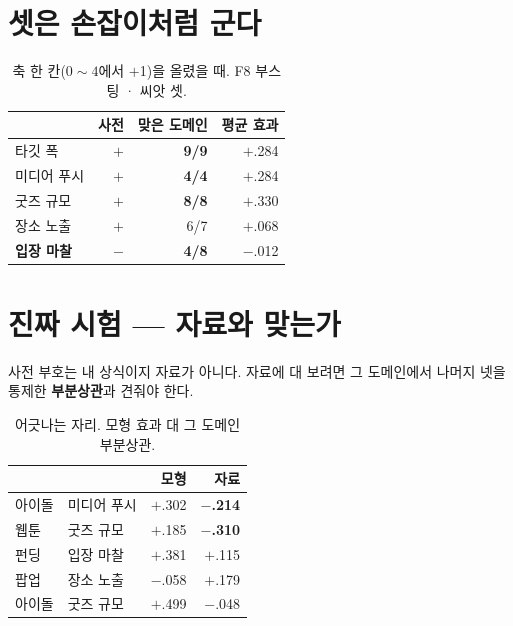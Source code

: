 \documentclass[10pt]{article}
\begin{document}
\section{셋은 손잡이처럼 군다}

\begin{table}[t]
\centering\tsize
\caption{축 한 칸($0\!\sim\!4$에서 $+$1)을 올렸을 때. F8 부스팅 · 씨앗 셋.}
\begin{tabular}{lrrr}
\toprule
& 사전 & 맞은 도메인 & 평균 효과 \\
\midrule
타깃 폭 & $+$ & \textbf{9/9} & $+$.284 \\
미디어 푸시 & $+$ & \textbf{4/4} & $+$.284 \\
굿즈 규모 & $+$ & \textbf{8/8} & $+$.330 \\
\midrule
장소 노출 & $+$ & 6/7 & $+$.068 \\
\textbf{입장 마찰} & $-$ & \textbf{4/8} & $-$.012 \\
\bottomrule
\end{tabular}
\end{table}



\section{진짜 시험 --- 자료와 맞는가}

사전 부호는 내 상식이지 자료가 아니다. 자료에 대 보려면 그 도메인에서
나머지 넷을 통제한 \textbf{부분상관}과 견줘야 한다.

\begin{table}[t]
\centering\tsize
\caption{어긋나는 자리. 모형 효과 대 그 도메인 부분상관.}
\begin{tabular}{llrr}
\toprule
& & 모형 & 자료 \\
\midrule
아이돌 & 미디어 푸시 & $+$.302 & \textbf{$-$.214} \\
웹툰 & 굿즈 규모 & $+$.185 & \textbf{$-$.310} \\
펀딩 & 입장 마찰 & $+$.381 & $+$.115 \\
팝업 & 장소 노출 & $-$.058 & $+$.179 \\
아이돌 & 굿즈 규모 & $+$.499 & $-$.048 \\
\bottomrule
\end{tabular}
\end{table}
\end{document}
